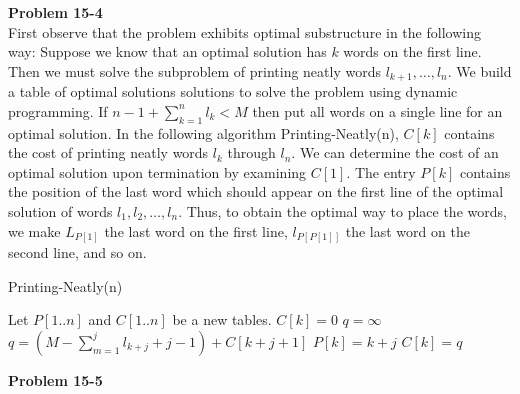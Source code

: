 \documentclass{article}
\begin{document}
\noindent\textbf{Problem 15-4}\\

First observe that the problem exhibits optimal substructure in the following way: Suppose we know that an optimal solution has $k$ words on the first line.  Then we must solve the subproblem of printing neatly words $l_{k+1}, \ldots, l_{n}$.  We build a table of optimal solutions solutions to solve the problem using dynamic programming.  If $n-1 + \sum_{k=1}^nl_k < M$ then put all words on a single line for an optimal solution.  In the following algorithm Printing-Neatly(n), $C[k]$ contains the cost of printing neatly words $l_k$ through $l_n$. We can determine the cost of an optimal solution upon termination by examining $C[1]$.  The entry $P[k]$ contains the position of the last word which should appear on the first line of the optimal solution of words $l_1, l_2, \ldots, l_n$.  Thus, to obtain the optimal way to place the words, we make $L_{P[1]}$ the last word on the first line, $l_{P[P[1]]}$ the last word on the second line, and so on.\\

\begin{algorithm}
\caption{Printing-Neatly(n)}
\begin{algorithmic}[1]
\State Let $P[1..n]$ and $C[1..n]$ be a new tables.
		\State $C[k] = 0$
	\EndIf
	\State $q = \infty$
			\State $q = (M - \sum_{m=1}^j l_{k+j} + j - 1) + C[k + j + 1]$
			\State $P[k] = k+j$
		\EndIf
	\EndFor
	\State $C[k] = q$
\EndFor
\end{algorithmic}
\end{algorithm}

\noindent\textbf{Problem 15-5}\\
\end{document}
